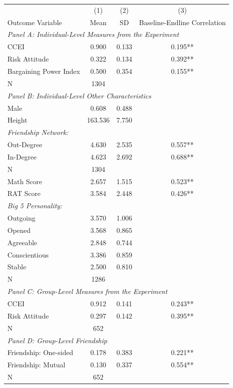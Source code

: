 \begin{tabular}{lccc}
\hline \toprule
 & (1) & (2) & (3) \\
Outcome Variable & Mean & SD & Baseline-Endline Correlation \\
\midrule
\multicolumn{4}{l}{\textit{Panel A: Individual-Level Measures from the Experiment}} \\
CCEI &  0.900 &  0.133 &  0.195** \\
Risk Attitude &  0.322 &  0.134 &  0.392** \\
Bargaining Power Index &  0.500 &  0.354 &  0.155** \\
N & 1304 & &  \\
\midrule
\multicolumn{4}{l}{\textit{Panel B: Individual-Level Other Characteristics}} \\
Male &  0.608 &  0.488 & \\
Height & 163.536 &  7.750 & \\
\textit{Friendship Network:} & & & \\
\quad Out-Degree &  4.630 &  2.535 &  0.557** \\
\quad In-Degree &  4.623 &  2.692 &  0.688** \\
 N & 1304 & & \\
Math Score &  2.657 &  1.515 &  0.523** \\
RAT Score &  3.584 &  2.448 &  0.426** \\
\textit{Big 5 Personality:} & & & \\
\quad Outgoing &  3.570 &  1.006 & \\
\quad Opened &  3.568 &  0.865 & \\
\quad Agreeable &  2.848 &  0.744 & \\
\quad Conscientious &  3.386 &  0.859 & \\
\quad Stable &  2.500 &  0.810 & \\
N & 1286 & & \\
\midrule
\multicolumn{4}{l}{\textit{Panel C: Group-Level Measures from the Experiment}} \\
CCEI &  0.912 &  0.141 &  0.243** \\
Risk Attitude &  0.297 &  0.142 &  0.395** \\
N  & 652 & & \\
\midrule
\multicolumn{4}{l}{\textit{Panel D: Group-Level Friendship}} \\
Friendship: One-sided &  0.178 &  0.383 &  0.221** \\
Friendship: Mutual &  0.130 &  0.337 &  0.554** \\
N & 652 & &  \\
\bottomrule \hline
\end{tabular}
